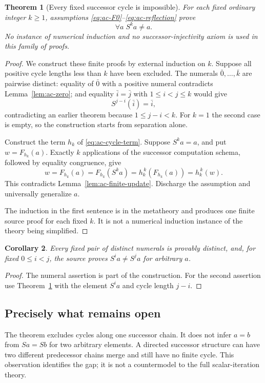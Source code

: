 \documentclass[11pt,letterpaper]{article}
\newtheorem{theorem}{Theorem}[section]
\newtheorem{corollary}[theorem]{Corollary}
\theoremstyle{definition}\newtheorem{definition}[theorem]{Definition}
\theoremstyle{remark}\newtheorem{remark}[theorem]{Remark}
\begin{document}
\begin{theorem}[Every fixed successor cycle is impossible]
\label{thm:ac-aperiodicity}
For each fixed ordinary integer $k\ge1$, assumptions
\eqref{eq:ac-F0}--\eqref{eq:ac-reflection} prove
\[
                           \forall a\;S^k a\ne a.
\]
No instance of numerical induction and no successor-injectivity axiom is
used in this family of proofs.
\end{theorem}
\begin{proof}
We construct these finite proofs by external induction on $k$.
Suppose all positive cycle lengths less than $k$ have been excluded.
The numerals $\bar0,\ldots,\bar k$ are pairwise distinct: equality of
$\bar0$ with a positive numeral contradicts Lemma~\ref{lem:ac-zero};
and equality $\bar i=\bar j$ with $1\le i<j\le k$ would give
\[
                   S^{j-i}(\bar i)=\bar i,
\]
contradicting an earlier theorem because $1\le j-i<k$. For $k=1$ the
second case is empty, so the construction starts from separation alone.

Construct the term $h_k$ of \eqref{eq:ac-cycle-term}. Suppose
$S^k a=a$, and put $w=F_{h_k}(a)$. Exactly $k$ applications of the
successor computation schema, followed by equality congruence, give
\[
 w=F_{h_k}(a)=F_{h_k}(S^k a)=h_k^{\,k}(F_{h_k}(a))=h_k^{\,k}(w).
\]
This contradicts Lemma~\ref{lem:ac-finite-update}. Discharge the
assumption and universally generalize $a$.

The induction in the first sentence is in the metatheory and produces
one finite source proof for each fixed $k$. It is not a numerical
induction instance of the theory being simplified.
\end{proof}

\begin{corollary}
Every fixed pair of distinct numerals is provably distinct, and, for
fixed $0\le i<j$, the source proves $S^i a\ne S^j a$ for arbitrary $a$.
\end{corollary}
\begin{proof}
The numeral assertion is part of the construction. For the second
assertion use Theorem~\ref{thm:ac-aperiodicity} with the element $S^i a$
and cycle length $j-i$.
\end{proof}

\subsection{Precisely what remains open}

The theorem excludes cycles along one successor chain. It does not infer
$a=b$ from $Sa=Sb$ for two arbitrary elements. A directed successor
structure can have two different predecessor chains merge and still have
no finite cycle. This observation identifies the gap; it is not a
countermodel to the full scalar-iteration theory.
\end{document}
